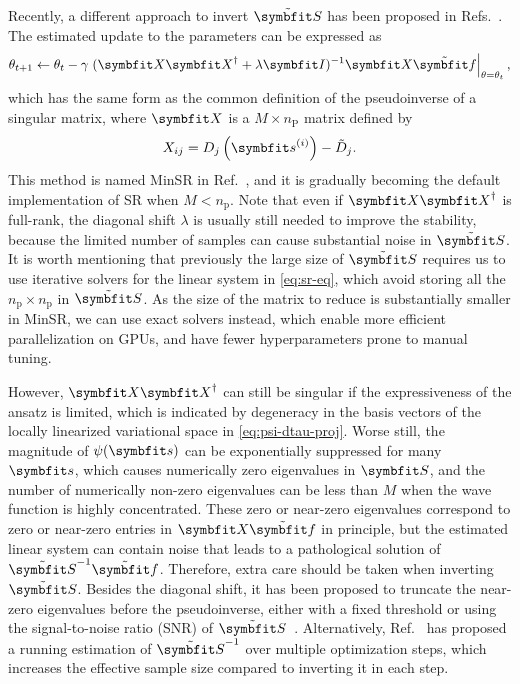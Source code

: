 Recently, a different approach to invert $\tilde{\mS}$ has been proposed in Refs.~\cite{chen2023efficient, rende2024simple}. The estimated update to the parameters can be expressed as
\begin{equation}
\theta_{t + 1} \gets \theta_t - \gamma \left. (\mX \mX^\dagger + \lambda \mI)^{-1} \mX \tilde{\vf} \right|_{\theta = \theta_t},
\label{eq:minsr}
\end{equation}
which has the same form as the common definition of the pseudoinverse of a singular matrix, where $\mX$ is a $M \times n_\text{P}$ matrix defined by
\begin{equation}
X_{i j} = D_j\left( \vs^{(i)} \right) - \tilde{D}_j.
\end{equation}
This method is named MinSR in Ref.~\cite{chen2023efficient}, and it is gradually becoming the default implementation of SR when $M < n_\text{p}$. Note that even if $\mX \mX^\dagger$ is full-rank, the diagonal shift $\lambda$ is usually still needed to improve the stability, because the limited number of samples can cause substantial noise in $\tilde{\mS}$. It is worth mentioning that previously the large size of $\tilde{\mS}$ requires us to use iterative solvers for the linear system in \cref{eq:sr-eq}, which avoid storing all the $n_\text{p} \times n_\text{p}$ in $\tilde{\mS}$. As the size of the matrix to reduce is substantially smaller in MinSR, we can use exact solvers instead, which enable more efficient parallelization on GPUs, and have fewer hyperparameters prone to manual tuning.

However, $\mX \mX^\dagger$ can still be singular if the expressiveness of the ansatz is limited, which is indicated by degeneracy in the basis vectors of the locally linearized variational space in \cref{eq:psi-dtau-proj}. Worse still, the magnitude of $\psi(\vs)$ can be exponentially suppressed for many $\vs$, which causes numerically zero eigenvalues in $\mS$, and the number of numerically non-zero eigenvalues can be less than $M$ when the wave function is highly concentrated. These zero or near-zero eigenvalues correspond to zero or near-zero entries in $\mX \tilde{\vf}$ in principle, but the estimated linear system can contain noise that leads to a pathological solution of $\tilde{\mS}^{-1} \tilde{\vf}$. Therefore, extra care should be taken when inverting $\tilde{\mS}$. Besides the diagonal shift, it has been proposed to truncate the near-zero eigenvalues before the pseudoinverse, either with a fixed threshold or using the signal-to-noise ratio (SNR) of $\tilde{\mS}$~\cite{schmitt2020quantum, chen2023efficient}. Alternatively, Ref.~\cite{goldshlager2024kaczmarz} has proposed a running estimation of $\tilde{\mS}^{-1}$ over multiple optimization steps, which increases the effective sample size compared to inverting it in each step.

